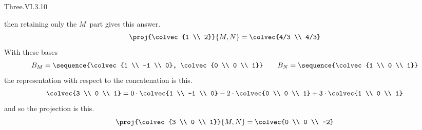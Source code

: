 \begin{ans}{Three.VI.3.10}
\begin{exparts}
           then retaining only the $M$~part gives this answer.
           \begin{equation*}
             \proj{\colvec{1 \\ 2}}{M,N}=\colvec{4/3 \\ 4/3}
           \end{equation*}
         \partsitem With these bases
           \begin{equation*}
             B_M=\sequence{\colvec{1 \\ -1 \\ 0},
                           \colvec{0 \\ 0 \\ 1}}
             \qquad
             B_N=\sequence{\colvec{1 \\ 0 \\ 1}}
           \end{equation*}
           the representation with respect to the concatenation is this.
           \begin{equation*}
             \colvec{3 \\ 0 \\ 1}
               =0\cdot\colvec{1 \\ -1 \\ 0}
                -2\cdot\colvec{0 \\ 0 \\ 1}
                +3\cdot\colvec{1 \\ 0 \\ 1}
           \end{equation*}
           and so the projection is this.
           \begin{equation*}
             \proj{\colvec{3 \\ 0 \\ 1}}{M,N}=\colvec{0 \\ 0 \\ -2}
           \end{equation*}
       \end{exparts}
     
\end{ans}

